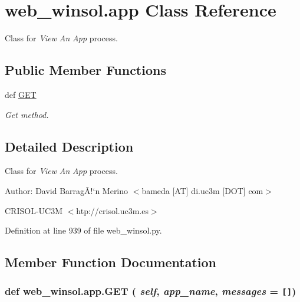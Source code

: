 \hypertarget{classweb__winsol_1_1app}{
\section{web\_\-winsol.app Class Reference}
\label{classweb__winsol_1_1app}
}
Class for {\em View\/} {\em An\/} {\em App\/} process.  


\subsection*{Public Member Functions}
\begin{CompactItemize}
\item 
def \hyperlink{classweb__winsol_1_1app_3395f5e8e84723ce646791b9a19a2eae}{GET}
\begin{CompactList}\small\item\em Get method. \item\end{CompactList}\end{CompactItemize}


\subsection{Detailed Description}
Class for {\em View\/} {\em An\/} {\em App\/} process. 

\begin{Desc}
\item[Author:]David Barrag\~{A}!`n Merino $<$bameda \mbox{[}AT\mbox{]} di.uc3m \mbox{[}DOT\mbox{]} com$>$ 

CRISOL-UC3M $<$htp://crisol.uc3m.es$>$ \end{Desc}




Definition at line 939 of file web\_\-winsol.py.

\subsection{Member Function Documentation}
\hypertarget{classweb__winsol_1_1app_3395f5e8e84723ce646791b9a19a2eae}{
\subsubsection[GET]{\setlength{\rightskip}{0pt plus 5cm}def web\_\-winsol.app.GET ( {\em self},  {\em app\_\-name},  {\em messages} = {\tt \mbox{[}\mbox{]}})}}
\label{classweb__winsol_1_1app_3395f5e8e84723ce646791b9a19a2eae}


